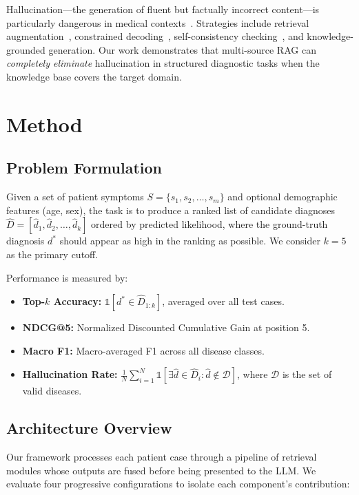 \documentclass[review]{elsarticle}
\begin{document}
Hallucination---the generation of fluent but factually incorrect content---is particularly dangerous in medical contexts~\cite{ji2023survey,umapathi2023med}. Strategies include retrieval augmentation~\cite{shuster2021retrieval}, constrained decoding~\cite{lu2022neurologic}, self-consistency checking~\cite{manakul2023selfcheckgpt}, and knowledge-grounded generation. Our work demonstrates that multi-source RAG can \emph{completely eliminate} hallucination in structured diagnostic tasks when the knowledge base covers the target domain.

\section{Method}
\label{sec:method}

\subsection{Problem Formulation}

Given a set of patient symptoms $S = \{s_1, s_2, \ldots, s_m\}$ and optional demographic features (age, sex), the task is to produce a ranked list of candidate diagnoses $\hat{D} = [\hat{d}_1, \hat{d}_2, \ldots, \hat{d}_k]$ ordered by predicted likelihood, where the ground-truth diagnosis $d^*$ should appear as high in the ranking as possible. We consider $k=5$ as the primary cutoff.

Performance is measured by:
\begin{itemize}
    \item \textbf{Top-$k$ Accuracy:} $\mathbb{1}[d^* \in \hat{D}_{1:k}]$, averaged over all test cases.
    \item \textbf{NDCG@5:} Normalized Discounted Cumulative Gain at position 5.
    \item \textbf{Macro F1:} Macro-averaged F1 across all disease classes.
    \item \textbf{Hallucination Rate:} $\frac{1}{N}\sum_{i=1}^{N} \mathbb{1}[\exists \hat{d} \in \hat{D}_i : \hat{d} \notin \mathcal{D}]$, where $\mathcal{D}$ is the set of valid diseases.
\end{itemize}

\subsection{Architecture Overview}

Our framework processes each patient case through a pipeline of retrieval modules whose outputs are fused before being presented to the LLM. We evaluate four progressive configurations to isolate each component's contribution:
\end{document}
